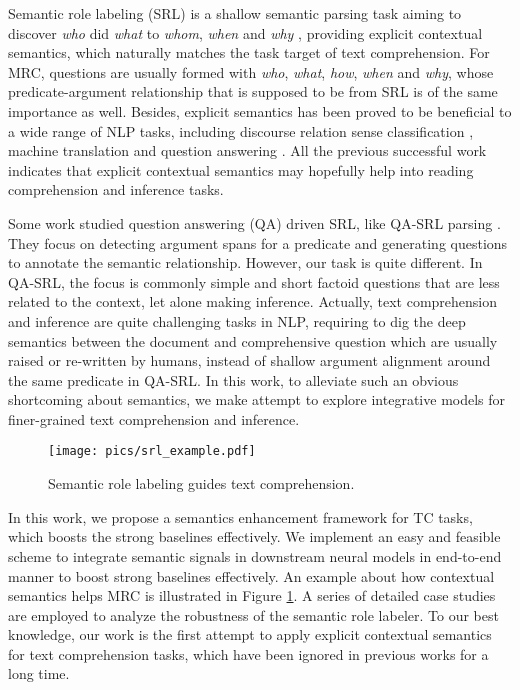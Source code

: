 \documentclass[11pt]{article}
\begin{document}
Semantic role labeling (SRL) is a shallow semantic parsing task aiming to discover \emph{who} did \emph{what} to \emph{whom}, \emph{when} and \emph{why}  \citep{He2018Syntax,li2018unified,li2019dependency}, providing explicit contextual semantics, which naturally matches the task target of text comprehension. For MRC, questions are usually formed with \emph{who}, \emph{what}, \emph{how}, \emph{when} and \emph{why}, whose predicate-argument relationship that is supposed to be from SRL is of the same importance as well. Besides, explicit semantics has been proved to be beneficial to a wide range of NLP tasks, including discourse relation sense classification \citep{Mihaylov2016Discourse}, machine translation \citep{Shi2016Knowledge} and question answering \citep{Yih2016The}. All the previous successful work indicates that explicit contextual semantics may hopefully help into reading comprehension and inference tasks. 


Some work studied question answering (QA) driven SRL, like QA-SRL parsing \citep{he2015question,Mccann2018The,Fitzgerald2018Large}. They focus on detecting argument spans for a predicate and generating questions to annotate the semantic relationship. However, our task is quite different. In QA-SRL, the focus is commonly simple and short factoid questions that are less related to the context, let alone making inference. Actually, text comprehension and inference are quite challenging tasks in NLP, requiring to dig the deep semantics between the document and comprehensive question which are usually raised or re-written by humans, instead of shallow argument alignment around the same predicate in QA-SRL. In this work, to alleviate such an obvious shortcoming about semantics, we make attempt to explore integrative models for finer-grained text comprehension and inference.
\begin{figure}
	\centering
	\texttt{[image: pics/srl\_example.pdf]}
	\caption{\label{fig:srl_example}Semantic role labeling guides text comprehension.}
\end{figure}

In this work, we propose a semantics enhancement framework for TC tasks, which boosts the strong baselines effectively. We implement an easy and feasible scheme to integrate semantic signals in downstream neural models in end-to-end manner to boost strong baselines effectively. An example about how contextual semantics helps MRC is illustrated in Figure \ref{fig:srl_example}. A series of detailed case studies are employed to analyze the robustness of the semantic role labeler. To our best knowledge, our work is the first attempt to apply explicit contextual semantics for text comprehension tasks, which have been ignored in previous works for a long time.
\end{document}
